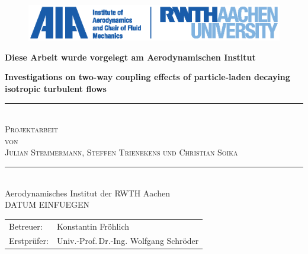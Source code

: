 \documentclass[11pt,a4paper,openany,oneside,parskip=half*]{article}
\newcommand{\HRule}{\rule{\linewidth}{0.5mm}}  %
\begin{document}
\begin{titlepage}
\begin{figure}[htp]
\vspace*{-3cm} 
\hspace*{2.7cm}  
\includegraphics{./Titelseite/rwth_aia_en_rgb.eps}
\end{figure}
\begin{center}
\textbf{Diese Arbeit wurde vorgelegt am Aerodynamischen Institut}
\end{center}
\begin{center} %
\vspace*{4.2cm} %
{ \huge \bfseries Investigations on two-way coupling effects of particle-laden decaying isotropic turbulent flows}\\[0.3cm] %
\HRule \\[0.5cm] %
\textsc{\Large{Projektarbeit}}\\ %
\textsc{\Large{von}}\\
\textsc{\LARGE{Julian Stemmermann, Steffen Trienekens und Christian Soika}}\\[0.5cm]
\HRule \\[0.4cm]
{\Large{Aerodynamisches Institut der RWTH Aachen}}\\[.5cm]
{\large DATUM EINFUEGEN} \\[1.5cm] %
\vfill %
\begin{flushleft} \large  %
\begin{tabular}{ll} %
Betreuer: &Konstantin Fr\"ohlich \\
Erstpr\"ufer: &Univ.-Prof.\,Dr.-Ing. Wolfgang Schr\"oder
\end{tabular}
\end{flushleft}
\vfill %
\end{center}
\end{titlepage}

\end{document}
